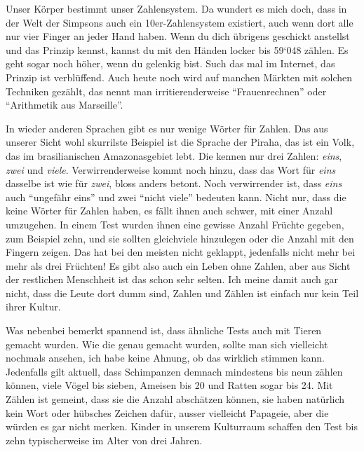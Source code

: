 Unser Körper bestimmt unser Zahlensystem. Da wundert es mich doch, dass in der Welt der Simpsons auch ein 10er-Zahlensystem existiert, auch wenn dort alle nur vier Finger an jeder Hand haben. Wenn du dich übrigens geschickt anstellst und das Prinzip kennst, kannst du mit den Händen locker bis 59‘048 zählen. Es geht sogar noch höher, wenn du gelenkig bist. Such das mal im Internet, das Prinzip ist verblüffend. Auch heute noch wird auf manchen Märkten mit solchen Techniken gezählt, das nennt man irritierenderweise \enquote{Frauenrechnen} oder \enquote{Arithmetik aus Marseille}.

In wieder anderen Sprachen gibt es nur wenige Wörter für Zahlen. Das aus unserer Sicht wohl skurrilste Beispiel ist die Sprache der Piraha, das ist ein Volk, das im brasilianischen Amazonasgebiet lebt. Die kennen nur drei Zahlen: \textit{eins}, \textit{zwei} und \textit{viele}. Verwirrenderweise kommt noch hinzu, dass das Wort für \textit{eins} dasselbe ist wie für \textit{zwei}, bloss anders betont. Noch verwirrender ist, dass \textit{eins} auch \enquote{ungefähr eins} und zwei \enquote{nicht viele} bedeuten kann. Nicht nur, dass die keine Wörter für Zahlen haben, es fällt ihnen auch schwer, mit einer Anzahl umzugehen. In einem Test wurden ihnen eine gewisse Anzahl Früchte gegeben, zum Beispiel zehn, und sie sollten gleichviele hinzulegen oder die Anzahl mit den Fingern zeigen. Das hat bei den meisten nicht geklappt, jedenfalls nicht mehr bei mehr als drei Früchten! Es gibt also auch ein Leben ohne Zahlen, aber aus Sicht der restlichen Menschheit ist das schon sehr selten. Ich meine damit auch gar nicht, dass die Leute dort dumm sind, Zahlen und Zählen ist einfach nur kein Teil ihrer Kultur.

Was nebenbei bemerkt spannend ist, dass ähnliche Tests auch mit Tieren gemacht wurden. Wie die genau gemacht wurden, sollte man sich vielleicht nochmals ansehen, ich habe keine Ahnung, ob das wirklich stimmen kann. Jedenfalls gilt aktuell, dass Schimpanzen demnach mindestens bis neun zählen können, viele Vögel bis sieben, Ameisen bis 20 und Ratten sogar bis 24. Mit Zählen ist gemeint, dass sie die Anzahl abschätzen können, sie haben natürlich kein Wort oder hübsches Zeichen dafür, ausser vielleicht Papageie, aber die würden es gar nicht merken. Kinder in unserem Kulturraum schaffen den Test bis zehn typischerweise im Alter von drei Jahren.


